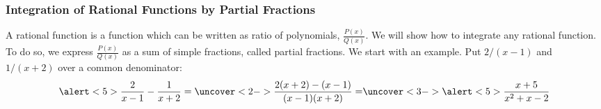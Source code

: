 \begin{frame}
\frametitle{Integration of Rational Functions by Partial Fractions}
A rational function is a function which can be written as ratio of polynomials, $\frac{P(x)}{Q(x)}$. We will show how to integrate any rational function. To do so, we express $\frac{P(x)}{Q(x)}$ as a sum of simple fractions, called partial fractions. We start with an example. Put $2/(x-1)$ and $1/(x+2)$ over a common denominator:
\[
\alert<5>{\frac{2}{x-1} - \frac{1}{x+2} } = %
\uncover<2->{%
\frac{2(x+2) - (x-1)}{(x-1)(x+2)} = %
}%
\uncover<3->{%
\alert<5>{ \frac{x + 5}{x^2+x-2} }%
}%
\]

%

\end{frame}

